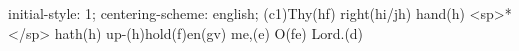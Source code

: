initial-style: 1;
centering-scheme: english;
(c1)Thy(hf) right(hi/jh) hand(h) <sp>*</sp> hath(h) up-(h)hold(f)en(gv) me,(e) O(fe) Lord.(d)
